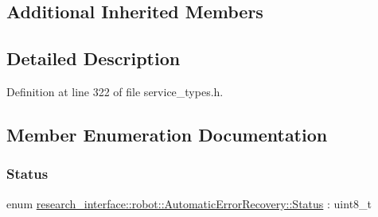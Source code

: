 \subsection*{Additional Inherited Members}


\subsection{Detailed Description}


Definition at line 322 of file service\+\_\+types.\+h.



\subsection{Member Enumeration Documentation}
\mbox{\label{structresearch__interface_1_1robot_1_1AutomaticErrorRecovery_a551f4dbc4e62d57b411344538b806adc}} 
\subsubsection{\texorpdfstring{Status}{Status}}
{\footnotesize\ttfamily enum \hyperlink{structresearch__interface_1_1robot_1_1AutomaticErrorRecovery_a551f4dbc4e62d57b411344538b806adc}{research\+\_\+interface\+::robot\+::\+Automatic\+Error\+Recovery\+::\+Status} \+: uint8\+\_\+t\hspace{0.3cm}{\ttfamily [strong]}}

